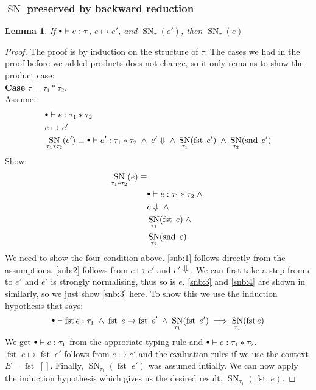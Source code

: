 \documentclass[a4paper,10pt,fleqn]{article}
\DeclareMathOperator{\SNPred}{SN}
\DeclareMathOperator{\fst}{fst}
\DeclareMathOperator{\snd}{snd}
\newcommand{\evalto}{\ensuremath{\mapsto}}
\newcommand{\mtenv}{{\raisebox{1.5pt}{$\scriptstyle\bullet$}}}
\newcommand{\case}[1]{~\\{\bf Case} #1,~\\}
\newcommand{\SN}[2]{\ensuremath{\SNPred_{#1}(#2)}}
\newcommand{\pand}{\ensuremath{\; \wedge \;}}
\newtheorem*{lemma}{Lemma}
\begin{document}
\subsubsection*{$\SNPred$ preserved by backward reduction}
\begin{lemma}
  If $\mtenv \vdash e : \tau$, $e \evalto e'$, and $\SN{\tau}{e'}$, then $\SN{\tau}{e}$
\end{lemma}
\begin{proof}
  The proof is by induction on the structure of $\tau$. The cases we had in the proof before we added products does not change, so it only remains to show the product case:
  \case{$\tau = \tau_1 * \tau_2$}
  Assume:
  \begin{align*}
    & \mtenv \vdash e : \tau_1 * \tau_2 \\
    & e \evalto e' \\
    & \SN{\tau_1*\tau_2}{e'} \equiv \mtenv \vdash e' : \tau_1 * \tau_2  \pand e' \Downarrow \pand \SN{\tau_1}{\fst \; e'} \pand \SN{\tau_2}{\snd \; e'}
  \end{align*}
  Show:  
  \begin{align}
    \SN{\tau_1*\tau_2}{e} \equiv & \nonumber \\
                                &\mtenv \vdash e : \tau_1 * \tau_2  \pand \label{snb:1}\\
                                &e \Downarrow \pand \label{snb:2}\\
                                &\SN{\tau_1}{\fst \; e} \pand \label{snb:3} \\
                                &\SN{\tau_2}{\snd \; e} \label{snb:4}
  \end{align}
  We need to show the four condition above. \ref{snb:1} follows directly from the assumptions. \ref{snb:2} follows from $e \evalto e'$ and $e' \Downarrow$. We can first take a step from $e$ to $e'$ and $e'$ is strongly normalising, thus so is $e$. \ref{snb:3} and \ref{snb:4} are shown in similarly, so we just show \ref{snb:3} here. To show this we use the induction hypothesis that says:
\[
  \mtenv \vdash \fst e : \tau_1 \pand \fst \; e \evalto \fst \; e' \pand \SN{\tau_1}{\fst \; e'} \implies \SN{\tau_1}{\fst e}
\]
We get $\mtenv \vdash e : \tau_1$ from the approriate typing rule and $\mtenv \vdash e : \tau_1 * \tau_2$. $\fst \; e \evalto \fst \; e'$ follows from $e \evalto e'$ and the evaluation rules if we use the context $E=\fst \; []$. Finally, $\SN{\tau_1}{\fst \; e'}$ was assumed intially. We can now apply the induction hypothesis which gives us the desired result, $\SN{\tau_1}{\fst \; e}$.
\end{proof}
\end{document}
